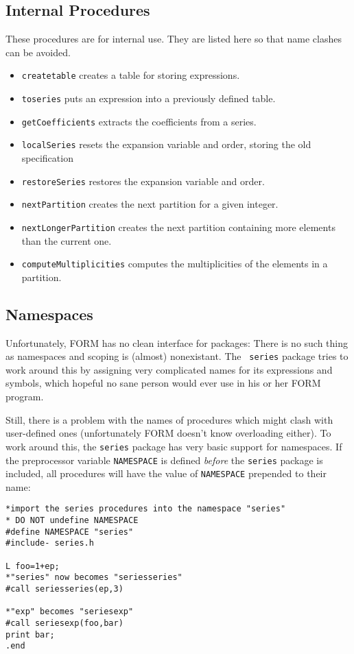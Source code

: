 \documentclass{article}
\begin{document}
\subsection{Internal Procedures}
\label{sec:proc_internal}
These procedures are for internal use. They are listed here so that name
clashes can be avoided.
\begin{itemize}
\item {\tt createtable} creates a table for storing expressions.
\item {\tt toseries} puts an expression into a previously defined table.
\item {\tt getCoefficients} extracts the coefficients from a series.
\item {\tt localSeries} resets the expansion variable and order, storing
  the old specification
\item {\tt restoreSeries} restores the expansion variable and order.
\item {\tt nextPartition} creates the next partition for a given integer.
\item {\tt nextLongerPartition} creates the next partition containing
  more elements than the current one.
\item {\tt computeMultiplicities} computes the multiplicities of the
  elements in a partition.
\end{itemize}

\subsection{Namespaces}
\label{sec:namesp}

Unfortunately, FORM has no clean interface for packages: There is no
such thing as namespaces and scoping is (almost) nonexistant. The {\tt
  series} package tries to work around this by assigning very complicated
names for its expressions and symbols, which hopeful no sane person
would ever use in his or her FORM program.

Still, there is a problem with the names of procedures which might clash
with user-defined ones (unfortunately FORM doesn't know overloading
either). To work around this, the {\tt series} package has very basic
support for namespaces. If the preprocessor variable {\tt NAMESPACE} is
defined {\em before} the {\tt series} package is included, all
procedures will have the value of {\tt NAMESPACE} prepended to their name:
\begin{verbatim}
*import the series procedures into the namespace "series"
* DO NOT undefine NAMESPACE
#define NAMESPACE "series"
#include- series.h

L foo=1+ep;
*"series" now becomes "seriesseries"
#call seriesseries(ep,3)

*"exp" becomes "seriesexp"
#call seriesexp(foo,bar)
print bar;
.end
\end{verbatim}
\end{document}

